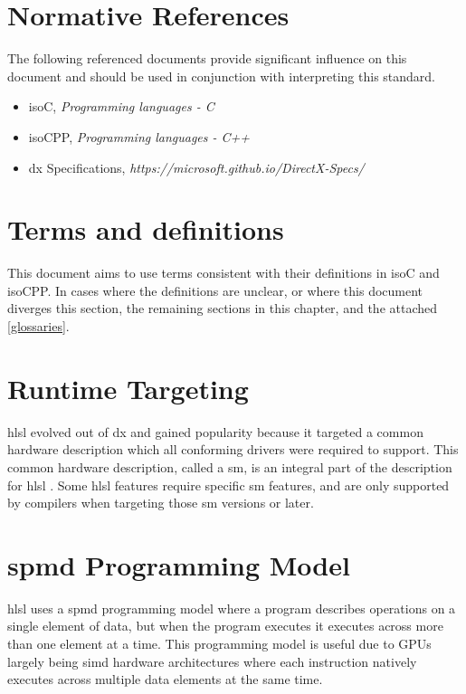 \section{Normative References} \label{sec:Refs}

\p The following referenced documents provide significant influence on this
document and should be used in conjunction with interpreting this standard.

\begin{itemize}
  \item \gls{isoC}, \textit{Programming languages - C}
  \item \gls{isoCPP}, \textit{Programming languages - C++}
  \item \gls{dx} Specifications, \textit{https://microsoft.github.io/DirectX-Specs/}
\end{itemize}

\section{Terms and definitions} \label{sec:Terms}

\p This document aims to use terms consistent with their definitions in
\gls{isoC} and \gls{isoCPP}. In cases where the definitions are unclear, or
where this document diverges this section, the remaining sections in this
chapter, and the attached \ref{glossaries}.

\section{Runtime Targeting} \label{sec:Runtime}

\p \acrshort{hlsl} evolved out of \gls{dx} and gained popularity because it
targeted a common hardware description which all conforming drivers were
required to support. This common hardware description, called a \gls{sm}, is an
integral part of the description for \acrshort{hlsl} . Some \acrshort{hlsl}
features require specific \gls{sm} features, and are only supported by compilers
when targeting those \gls{sm} versions or later.

\section{\acrfull{spmd} Programming Model} \label{sec:Model}

\p \acrshort{hlsl} uses a \acrfull{spmd} programming model where a program
describes operations on a single element of data, but when the program executes
it executes across more than one element at a time. This programming model is
useful due to GPUs largely being \acrfull{simd} hardware architectures where
each instruction natively executes across multiple data elements at the same
time.


